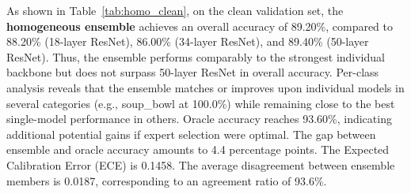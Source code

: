 As shown in Table~\ref{tab:homo_clean}, on the clean validation set, the \textbf{homogeneous ensemble} achieves an overall accuracy of 89.20\%, compared to 88.20\% (18-layer ResNet), 86.00\% (34-layer ResNet), and 89.40\% (50-layer ResNet). 
Thus, the ensemble performs comparably to the strongest individual backbone but does not surpass 50-layer ResNet in overall accuracy.
Per-class analysis reveals that the ensemble matches or improves upon individual models in several categories (e.g., soup\_bowl at 100.0\%) while remaining close to the best single-model performance in others.
Oracle accuracy reaches 93.60\%, indicating additional potential gains if expert selection were optimal. 
The gap between ensemble and oracle accuracy amounts to 4.4 percentage points.
The Expected Calibration Error (ECE) is 0.1458. 
The average disagreement between ensemble members is 0.0187, corresponding to an agreement ratio of 93.6\%.
